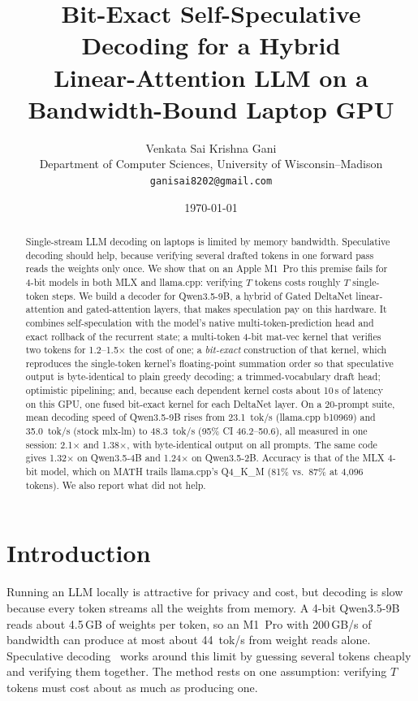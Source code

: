 \documentclass[11pt]{article}
\title{Bit-Exact Self-Speculative Decoding for a Hybrid\\Linear-Attention LLM on a Bandwidth-Bound Laptop GPU}
\author{Venkata Sai Krishna Gani\\Department of Computer Sciences, University of Wisconsin--Madison\\\texttt{ganisai8202@gmail.com}}
\date{\today}
\begin{document}
\maketitle

\begin{abstract}
Single-stream LLM decoding on laptops is limited by memory bandwidth. Speculative decoding should help, because verifying several drafted tokens in one forward pass reads the weights only once. We show that on an Apple M1~Pro this premise fails for 4-bit models in both MLX and llama.cpp: verifying $T$ tokens costs roughly $T$ single-token steps. We build a decoder for Qwen3.5-9B, a hybrid of Gated DeltaNet linear-attention and gated-attention layers, that makes speculation pay on this hardware. It combines self-speculation with the model's native multi-token-prediction head and exact rollback of the recurrent state; a multi-token 4-bit mat-vec kernel that verifies two tokens for 1.2--1.5$\times$ the cost of one; a \emph{bit-exact} construction of that kernel, which reproduces the single-token kernel's floating-point summation order so that speculative output is byte-identical to plain greedy decoding; a trimmed-vocabulary draft head; optimistic pipelining; and, because each dependent kernel costs about 10\,\textmu s of latency on this GPU, one fused bit-exact kernel for each DeltaNet layer. On a 20-prompt suite, mean decoding speed of Qwen3.5-9B rises from 23.1~tok/s (llama.cpp b10969) and 35.0~tok/s (stock mlx-lm) to 48.3~tok/s (95\% CI 46.2--50.6), all measured in one session: 2.1$\times$ and 1.38$\times$, with byte-identical output on all prompts. The same code gives 1.32$\times$ on Qwen3.5-4B and 1.24$\times$ on Qwen3.5-2B. Accuracy is that of the MLX 4-bit model, which on MATH trails llama.cpp's Q4\_K\_M (81\% vs.\ 87\% at 4{,}096 tokens). We also report what did not help.
\end{abstract}

\section{Introduction}
Running an LLM locally is attractive for privacy and cost, but decoding is slow because every token streams all the weights from memory. A 4-bit Qwen3.5-9B reads about 4.5\,GB of weights per token, so an M1~Pro with 200\,GB/s of bandwidth can produce at most about 44~tok/s from weight reads alone. Speculative decoding~\cite{leviathan2023fast,chen2023accelerating} works around this limit by guessing several tokens cheaply and verifying them together. The method rests on one assumption: verifying $T$ tokens must cost about as much as producing one.
\end{document}
